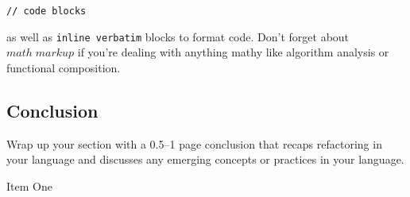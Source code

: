 \documentclass{article}
\begin{document}
\begin{verbatim}
// code blocks
\end{verbatim}

as well as \verb!inline verbatim! blocks to format code. Don't forget about $math \; markup$ if you're dealing with anything mathy like algorithm analysis or functional composition.

\subsection*{Conclusion}

Wrap up your section with a 0.5--1 page conclusion that recaps refactoring in your language and discusses any emerging concepts or practices in your language.

\begin{thebibliography}{9}
 Item One
\end{thebibliography}
\end{document}
